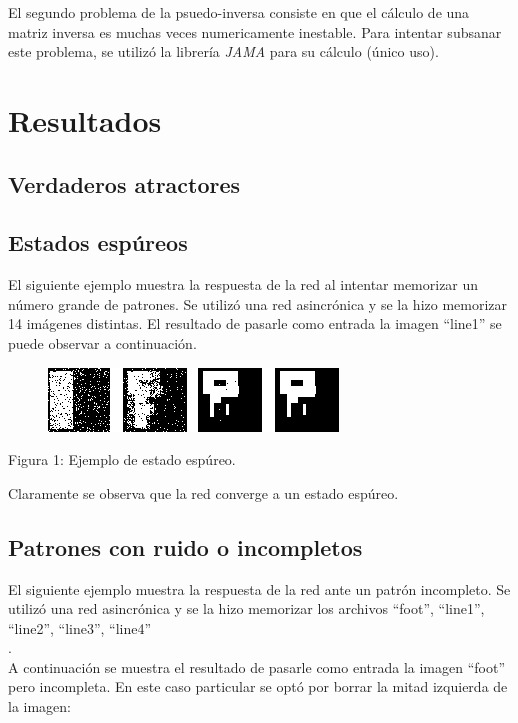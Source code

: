 \documentclass[%
    final,
    reprint,
    notitlepage,
    narroweqnarray,
    inline,
    twoside,
    invited
    ]{ieee}
\begin{document}
\par El segundo problema de la psuedo-inversa consiste en que el cálculo de una matriz inversa 
es muchas veces numericamente inestable. Para intentar subsanar este problema, se utilizó la librería \textit{JAMA} 
para su cálculo (único uso).



\section{Resultados}

\subsection{Verdaderos atractores} 

\subsection{Estados espúreos}

\par El siguiente ejemplo muestra la respuesta de la red al intentar memorizar un número grande de patrones. Se utilizó una red asincrónica y se la hizo memorizar 14 imágenes distintas. 
El resultado de pasarle como entrada la imagen ``line1'' se puede observar a continuación.\\

\begin{figure}[H]
\begin{center}
\includegraphics[scale=0.60]{./images/espureo.png}
\label{modelado}
\end{center}
\end{figure}

\begin{center}
\par Figura 1: Ejemplo de estado espúreo.
\end{center}

 Claramente se observa que la red converge a un estado espúreo.

\subsection{Patrones con ruido o incompletos}

\par El siguiente ejemplo muestra la respuesta de la red ante un patrón incompleto. Se utilizó una red asincrónica y se la hizo memorizar los archivos ``foot'', ``line1'', ``line2'', ``line3'', ``line4''\\.\\
A continuación se muestra el resultado de pasarle como entrada la imagen ``foot'' pero incompleta. En este caso particular se optó por borrar la mitad izquierda de la imagen: \\
\end{document}
